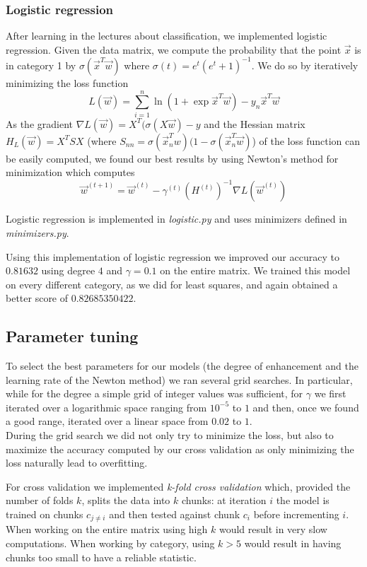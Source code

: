 \documentclass[10pt,conference,compsocconf]{IEEEtran}
\begin{document}
\subsubsection{Logistic regression} After learning in the lectures about classification, we implemented logistic regression. Given the data matrix, we compute the probability that the point $\vec{x}$ is in category 1 by $\sigma(\vec{x}^T\vec{w})$ where $\sigma(t) = e^t (e^t + 1)^{-1}$. We do so by iteratively minimizing the loss function
$$L(\vec{w}) = \sum^n_{i=1} \ln(1 + \exp{\vec{x}^T \vec{w}}) - y_n \vec{x}^T\vec{w}$$
As the gradient $\nabla L(\vec{w}) = X^T(\sigma(X\vec{w}) - y$ and the Hessian matrix $H_{L}(\vec{w}) = X^TSX$  (where $S_{nn} = \sigma(\vec{x}_n^T w)(1 - \sigma(\vec{x}_n^T\vec{w})$) of the loss function can be easily computed, we found our best results by using Newton's method for minimization which computes $$\vec{w}^{(t+1)} = \vec{w}^{(t)} - \gamma^{(t)} \left(H^{(t)}\right)^{-1}\nabla L\left(\vec{w}^{(t)}\right)$$

Logistic regression is implemented in \textit{logistic.py} and uses minimizers defined in \textit{minimizers.py}.

Using this implementation of logistic regression we improved our accuracy to $0.81632$ using degree $4$ and $\gamma = 0.1$ on the entire matrix. We trained this model on every different category, as we did for least squares, and again obtained a better score of $0.82685350422$.

\subsection{Parameter tuning}
To select the best parameters for our models (the degree of enhancement and the learning rate of the Newton method) we ran several grid searches. In particular, while for the degree a simple grid of integer values was sufficient, for $\gamma$ we first iterated over a logarithmic space ranging from $10^{-5}$ to $1$ and then, once we found a good range, iterated over a linear space from $0.02$ to $1$.\\
During the grid search we did not only try to minimize the loss, but also to maximize the accuracy computed by our cross validation as only minimizing the loss naturally lead to overfitting.

For cross validation we implemented \textit{k-fold cross validation} which, provided the number of folds $k$, splits the data into $k$ chunks: at iteration $i$ the model is trained on chunks $c_{j\neq i}$ and then tested against chunk $c_i$ before incrementing $i$. \\
When working on the entire matrix using high $k$ would result in very slow computations. When working by category, using $k>5$ would result in having chunks too small to have a reliable statistic.
\end{document}
